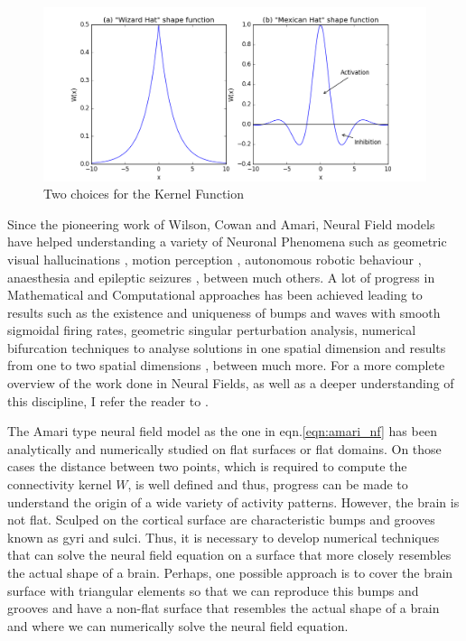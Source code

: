 \documentclass{uonmathreport}
\begin{document}
\begin{figure}
	\begin{center}
		\includegraphics[width=1\textwidth]{Figures/Kernels.png}
	\end{center}
	\caption{Two choices for the Kernel Function}
	\label{fig:kernls}
\end{figure}

Since the pioneering work of Wilson, Cowan and Amari, Neural Field models have helped understanding a variety of Neuronal Phenomena such as geometric visual hallucinations \cite{bressloff2001geometric}, motion perception \cite{giese2012dynamic}, autonomous robotic behaviour \cite{erlhagen2006dynamic}, anaesthesia \cite{liley2011mesoscopic} and epileptic seizures \cite{milton2013epilepsy}, between much others.
A lot of progress in Mathematical and Computational approaches has been achieved leading to results such as the existence and uniqueness of bumps \cite{kishimoto1979existence} and waves \cite{bressloff2014waves} with smooth sigmoidal firing rates, geometric singular perturbation analysis, numerical bifurcation techniques to analyse solutions in one spatial dimension \cite{laingatwo,pinto2001spatially,AVITABILE201524,rankin2014continuation} and results from one to two spatial dimensions \cite{coombes2012interface,folias2004breathing,laing2003pde,owen2007bumps,lima2015numerical}, between much more. For a more complete overview of the work done in Neural Fields, as well as a deeper understanding of this discipline, I refer the reader to \cite{coombes2012NeuralFields}.

The Amari type neural field model as the one in eqn.\ref{eqn:amari_nf} has been analytically and numerically studied on flat surfaces or flat domains. On those cases the distance between two points, which is required to compute the connectivity kernel $W$, is well defined and thus, progress can be made to understand the origin of a wide variety of activity patterns. However, the brain is not flat. Sculped on the cortical surface are characteristic bumps and grooves known as gyri and sulci. Thus, it is necessary to develop numerical techniques that can solve the neural field equation on a surface that more closely resembles the actual shape of a brain.  Perhaps, one possible approach is to cover the brain surface with triangular elements so that we can reproduce this bumps and grooves and have a non-flat surface that resembles the actual shape of a brain and where we can numerically solve the neural field equation.
\end{document}
